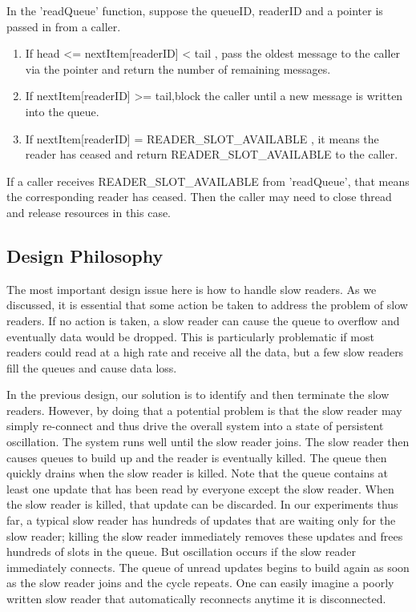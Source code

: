 In the 'readQueue' function, suppose the queueID, readerID and a pointer is passed in from a caller.
\begin{enumerate}
	\item{If head <= nextItem[readerID] < tail , pass the oldest message to the caller via the pointer and return the number of remaining messages.}
	\item{If nextItem[readerID] >= tail,block the caller until a new message is written into the queue. }
	\item{If nextItem[readerID] = READER\_SLOT\_AVAILABLE , it means the reader has ceased and return READER\_SLOT\_AVAILABLE to the caller.}
\end{enumerate}
If a caller receives READER\_SLOT\_AVAILABLE from 'readQueue', that means the corresponding reader has ceased. Then the caller may need to close thread and release resources in this case.

\subsection{Design Philosophy}
The most important design issue here is how to handle slow readers.  As we discussed, it is essential that some action be taken to address the problem of slow readers. If no action is taken,  a slow reader can cause the queue to overflow and eventually data would be dropped.   This is particularly problematic if most readers could read at a high rate and receive all the data, but a few slow readers fill the queues and cause data loss.   

In the previous design, our solution is to identify and then terminate the slow readers.  However, by doing that a potential problem is that the slow reader may simply re-connect and thus drive the overall system into a state of persistent oscillation.    The system runs well until the slow reader joins.   The slow reader then causes queues to build up and the reader is eventually killed.   The queue then quickly drains when the slow reader is killed.   Note that the queue contains at least one update that has been read by everyone except the slow reader.    When the slow reader is killed, that update can be discarded.    In our experiments thus far, a typical slow reader has hundreds of updates that are waiting only for the slow reader;  killing the slow reader immediately removes these updates and frees hundreds of slots in the queue.   But oscillation occurs if the slow reader immediately connects.    The queue of unread updates begins to build again as soon as the slow reader joins and the cycle repeats.   One can easily imagine a poorly written slow reader that automatically reconnects anytime it is disconnected.

